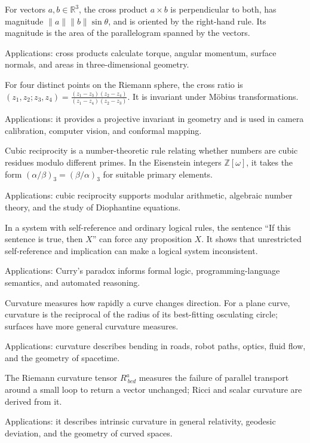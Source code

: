 For vectors $a,b\in\mathbb R^3$, the cross product $a\times b$ is perpendicular to both, has magnitude $\|a\|\|b\|\sin\theta$, and is oriented by the right-hand rule. Its magnitude is the area of the parallelogram spanned by the vectors. \par\noindent Applications: cross products calculate torque, angular momentum, surface normals, and areas in three-dimensional geometry.

For four distinct points on the Riemann sphere, the cross ratio is $(z_1,z_2;z_3,z_4)=\frac{(z_1-z_3)(z_2-z_4)}{(z_1-z_4)(z_2-z_3)}$. It is invariant under Möbius transformations. \par\noindent Applications: it provides a projective invariant in geometry and is used in camera calibration, computer vision, and conformal mapping.

Cubic reciprocity is a number-theoretic rule relating whether numbers are cubic residues modulo different primes. In the Eisenstein integers $\mathbb Z[\omega]$, it takes the form $(\alpha/\beta)_3=(\beta/\alpha)_3$ for suitable primary elements. \par\noindent Applications: cubic reciprocity supports modular arithmetic, algebraic number theory, and the study of Diophantine equations.

In a system with self-reference and ordinary logical rules, the sentence “If this sentence is true, then $X$” can force any proposition $X$. It shows that unrestricted self-reference and implication can make a logical system inconsistent. \par\noindent Applications: Curry's paradox informs formal logic, programming-language semantics, and automated reasoning.

Curvature measures how rapidly a curve changes direction. For a plane curve, curvature is the reciprocal of the radius of its best-fitting osculating circle; surfaces have more general curvature measures. \par\noindent Applications: curvature describes bending in roads, robot paths, optics, fluid flow, and the geometry of spacetime.

The Riemann curvature tensor $R^a_{\ bcd}$ measures the failure of parallel transport around a small loop to return a vector unchanged; Ricci and scalar curvature are derived from it. \par\noindent Applications: it describes intrinsic curvature in general relativity, geodesic deviation, and the geometry of curved spaces.

